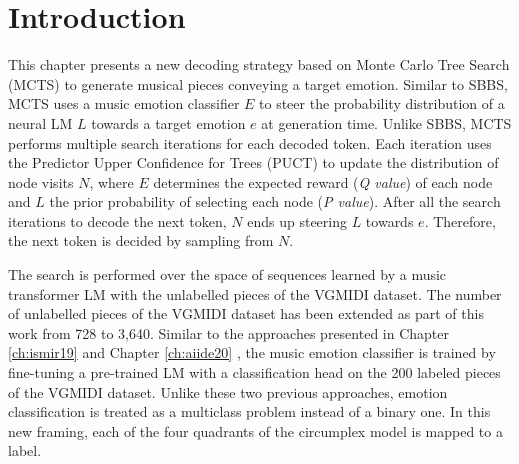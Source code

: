 \section{Introduction}


This chapter presents a new decoding strategy based on Monte Carlo Tree Search (MCTS) to generate musical pieces conveying a target emotion. Similar to SBBS, MCTS uses a music emotion classifier $E$ to steer the probability distribution of a neural LM $L$ towards a target emotion $e$ at generation time. Unlike SBBS, MCTS performs multiple search iterations for each decoded token. Each iteration uses the Predictor Upper Confidence for Trees (PUCT) to update the distribution of node visits $N$, where $E$ determines the expected reward (\textit{Q value}) of each node and $L$ the prior probability of selecting each node (\textit{P value}). After all the search iterations to decode the next token, $N$ ends up steering $L$ towards $e$. Therefore, the next token is decided by sampling from $N$.

The search is performed over the space of sequences learned by a music transformer LM \cite {huang2018music} with the unlabelled pieces of the VGMIDI dataset. The number of unlabelled pieces of the VGMIDI dataset has been extended as part of this work from 728 to 3,640. Similar to the approaches presented in Chapter \ref{ch:ismir19} \cite{ferreira_2019} and Chapter \ref{ch:aiide20} \cite{ferreira2020computer}, the music emotion classifier is trained by fine-tuning a pre-trained LM with a classification head on the 200 labeled pieces of the VGMIDI dataset. Unlike these two previous approaches, emotion classification is treated as a multiclass problem instead of a binary one. In this new framing, each of the four quadrants of the circumplex model is mapped to a label.

